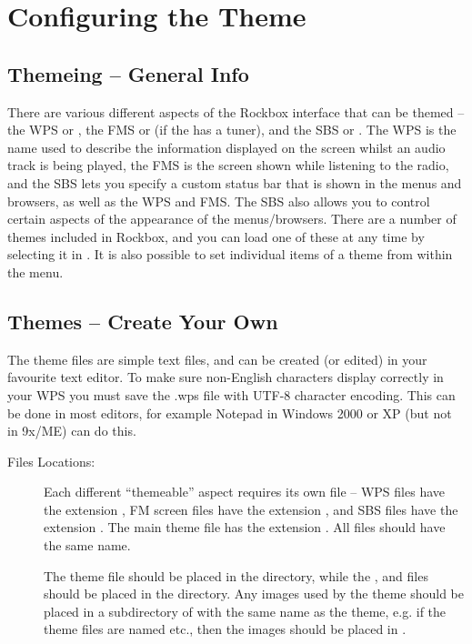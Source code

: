 \section{\label{ref:ConfiguringtheWPS}Configuring the Theme}

\subsection{Themeing -- General Info}

  There are various different aspects of the Rockbox interface
  that can be themed -- the WPS or , the FMS or
   (if the \dap{} has a tuner), and the SBS or
  . The WPS is the name used to
  describe the information displayed on the \daps{} screen whilst an audio
  track is being played, the FMS is the screen shown while listening to the
  radio, and the SBS lets you specify a custom status bar that is shown in the
  menus and browsers, as well as the WPS and FMS. The SBS also allows you to
  control certain aspects of the appearance of the menus/browsers.
  There are a number of themes included in Rockbox, and
  you can load one of these at any time by selecting it in
  .
  It is also possible to set individual items of a theme from within the
   menu.


\subsection{\label{ref:CreateYourOwnWPS}Themes -- Create Your Own}
The theme files are simple text files, and can be created (or edited) in your
favourite text editor. To make sure non-English characters 
display correctly in your WPS you must save the .wps file with UTF-8 character 
encoding. This can be done in most editors, for example Notepad in Windows 2000
or XP (but not in 9x/ME) can do this.

\begin{description}
\item [Files Locations: ] Each different ``themeable'' aspect requires its own file --
  WPS files have the extension , FM screen files have the extension
  , and SBS files have the extension . The main theme
  file has the extension . All files should have the same name.
  
  The theme  file should be placed in the 
  directory, while the ,  and  files should
  be placed in the  directory. Any images used by the
  theme should be placed in a subdirectory of  with the
  same name as the theme, e.g. if the theme files are named
   etc., then the images should be placed in
  .
\end{description}

